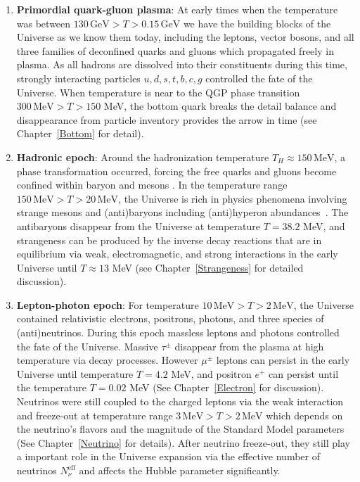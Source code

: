 \begin{enumerate}
 \item \textbf{Primordial quark-gluon plasma}: 
 At early times when the temperature was between $130\,\mathrm{GeV}>T>0.15\,\mathrm{GeV}$ we have the building blocks of the Universe as we know them today, including the leptons, vector bosons, and all three families of deconfined quarks and gluons which propagated freely in plasma. As all hadrons are dissolved into their constituents during this time, strongly interacting particles $u,d,s,t,b,c,g$ controlled the fate of the Universe. When temperature is near to the QGP phase transition $300\, \mathrm{MeV}>T>150$ MeV, the bottom quark breaks the detail balance and disappearance from particle inventory provides the arrow in time (see Chapter~\ref{Bottom} for detail).
 
 \item \textbf{Hadronic epoch}: Around the hadronization temperature $T_H\approx150\,\mathrm{MeV}$, a phase transformation occurred, forcing 
 the free quarks and gluons become confined within baryon and mesons \cite{Letessier:2005qe}. In the temperature range $ 150\,\mathrm{MeV}>T>20\,\mathrm{MeV}$, the Universe is rich in physics phenomena involving strange mesons and (anti)baryons including (anti)hyperon abundances~\cite{Fromerth:2012fe,Yang:2021bko}. The antibaryons disappear from the Universe at temperature $T=38.2$ MeV, and strangeness can be produced by the inverse decay reactions that are in equilibrium via weak, electromagnetic, and strong interactions in the early Universe until $T\approx13$ MeV (see Chapter~\ref{Strangeness} for detailed discussion).

 
 \item \textbf{Lepton-photon epoch}: For temperature $10\,\mathrm{MeV}>T>2\,\mathrm{MeV}$, the Universe contained relativistic electrons, positrons, photons, and three species of (anti)neutrinos. During this epoch massless leptons and photons controlled the fate of the Universe. Massive $\tau^\pm$ disappear from the plasma at high temperature via decay processes. However $\mu^\pm$ leptons can persist in the early Universe until temperature $T=4.2$ MeV, and positron $e^+$ can persist until the temperature $T=0.02$ MeV (See Chapter~\ref{Electron} for discussion).
 Neutrinos were still coupled to the charged leptons via the weak interaction~\cite{Birrell:2012gg,Birrell:2014ona} and freeze-out at temperature range $3\,\mathrm{MeV}>T>2\,\mathrm{MeV}$ which depends on the neutrino's flavors and the magnitude of the Standard Model parameters (See Chapter~\ref{Neutrino} for details). After neutrino freeze-out, they still play a important role in the Universe expansion via the effective number of neutrinos $N_{\nu}^{\mathrm{eff}}$ and affects the Hubble parameter significantly. 
 

\end{enumerate}
